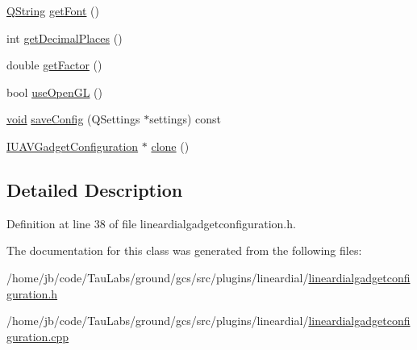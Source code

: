 \begin{DoxyCompactItemize}
\item 
\hyperlink{group___u_a_v_objects_plugin_gab9d252f49c333c94a72f97ce3105a32d}{\-Q\-String} \hyperlink{group___linear_dial_plugin_ga044d31fb1388d1f8b1b11f682c4e2aaa}{get\-Font} ()
\item 
int \hyperlink{group___linear_dial_plugin_gab0a4ac1f433766548d4f87e0d4c1c499}{get\-Decimal\-Places} ()
\item 
double \hyperlink{group___linear_dial_plugin_ga4bb648d826a5f7847ecdaa288a477b14}{get\-Factor} ()
\item 
bool \hyperlink{group___linear_dial_plugin_ga74595eab1c81ed96361010ba7f770bd1}{use\-Open\-G\-L} ()
\item 
\hyperlink{group___u_a_v_objects_plugin_ga444cf2ff3f0ecbe028adce838d373f5c}{void} \hyperlink{group___linear_dial_plugin_ga09129321da61b2494dca4ceafa18b996}{save\-Config} (\-Q\-Settings $\ast$settings) const 
\item 
\hyperlink{group___core_plugin_gacdfdf0b1e39b5002472b76b6564ce51f}{\-I\-U\-A\-V\-Gadget\-Configuration} $\ast$ \hyperlink{group___linear_dial_plugin_ga4b5d2c9802ec3b863732d6f707a1befe}{clone} ()
\end{DoxyCompactItemize}


\subsection{\-Detailed \-Description}


\-Definition at line 38 of file lineardialgadgetconfiguration.\-h.



\-The documentation for this class was generated from the following files\-:\begin{DoxyCompactItemize}
\item 
/home/jb/code/\-Tau\-Labs/ground/gcs/src/plugins/lineardial/\hyperlink{lineardialgadgetconfiguration_8h}{lineardialgadgetconfiguration.\-h}\item 
/home/jb/code/\-Tau\-Labs/ground/gcs/src/plugins/lineardial/\hyperlink{lineardialgadgetconfiguration_8cpp}{lineardialgadgetconfiguration.\-cpp}\end{DoxyCompactItemize}
